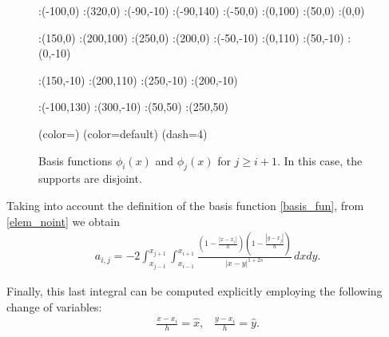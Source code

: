 \begin{figure}[h]
\figinit{0.7pt}
:(-100,0) :(320,0)
:(-90,-10) :(-90,140)
:(-50,0) :(0,100) 
:(50,0) :(0,0)

:(150,0) :(200,100) 
:(250,0) :(200,0)
%
:(-50,-10) :(0,110) 
:(50,-10) :(0,-10)

:(150,-10) :(200,110) 
:(250,-10) :(200,-10)

:(-100,130) :(300,-10)
:(50,50) :(250,50)

\figdrawbegin{}
\figdrawarrow[1,2]
\figdrawline[3,4]
\figdrawline[4,5]
\figset (color=\Redrgb)
\figdrawline[31,41]
\figdrawline[41,51]
\figset (color=default)
\figset(dash=4)
\figdrawline[4,6]
\figdrawline[41,61]
\figdrawarrow[11,12]

\figdrawend

\centerline{\box\figBoxA}
\caption{Basis functions $\phi_i(x)$ and $\phi_j(x)$ for $j\geq i+1$. In this case, the supports are disjoint.}\label{basis_upp_tri}
\end{figure}

Taking into account the definition of the basis function \eqref{basis_fun}, from \eqref{elem_noint} we obtain
\begin{align*}
	a_{i,j}=-2 \int_{x_{j-1}}^{x_{j+1}}\int_{x_{i-1}}^{x_{i+1}}\frac{\left(1-\frac{|x-x_i|}{h}\right)\left(1-\frac{|y-x_j|}{h}\right)}{|x-y|^{1+2s}}\,dxdy.
\end{align*}

Finally, this last integral can be computed explicitly employing the following  change of variables:
\begin{align}\label{cv}
	\frac{x-x_i}{h}=\hat{x},\;\;\; \frac{y-x_i}{h}=\hat{y}.
\end{align}

